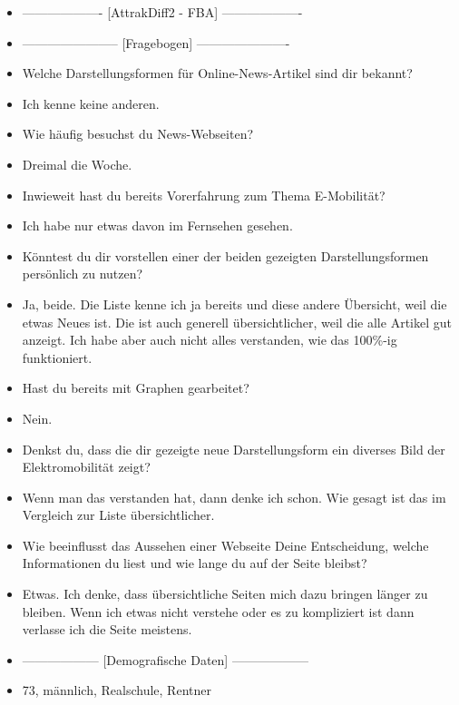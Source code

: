 {\begin{itemize}[]
        \item {-------------------} [AttrakDiff2 - FBA] {-------------------}
        \item {-----------------------} [Fragebogen] {----------------------}
        \item {} Welche Darstellungsformen für Online-News-Artikel sind dir bekannt?
        \item {} Ich kenne keine anderen.
        \item {} Wie häufig besuchst du News-Webseiten?
        \item {} Dreimal die Woche.
        \item {} Inwieweit hast du bereits Vorerfahrung zum Thema E-Mobilität?
        \item {} Ich habe nur etwas davon im Fernsehen gesehen.
        \item {} Könntest du dir vorstellen einer der beiden gezeigten Darstellungsformen persönlich zu nutzen?
        \item {} Ja, beide. Die Liste kenne ich ja bereits und diese andere Übersicht, weil die etwas Neues ist.
              Die ist auch generell übersichtlicher, weil die alle Artikel gut anzeigt.
              Ich habe aber auch nicht alles verstanden, wie das 100\%-ig funktioniert.
        \item {} Hast du bereits mit Graphen gearbeitet?
        \item {} Nein.
        \item {} Denkst du, dass die dir gezeigte neue Darstellungsform ein diverses Bild der Elektromobilität zeigt?
        \item {} Wenn man das verstanden hat, dann denke ich schon.
              Wie gesagt ist das im Vergleich zur Liste übersichtlicher.
        \item {} Wie beeinflusst das Aussehen einer Webseite Deine Entscheidung, welche Informationen du liest und wie lange du auf der Seite bleibst?
        \item {} Etwas. Ich denke, dass übersichtliche Seiten mich dazu bringen länger zu bleiben.
              Wenn ich etwas nicht verstehe oder es zu kompliziert ist dann verlasse ich die Seite meistens.
        \item {------------------} [Demografische Daten] {------------------}
        \item {} 73, männlich, Realschule, Rentner
    \end{itemize}}
\nolinenumbers
